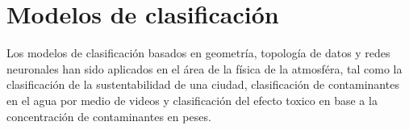 \section{Modelos de clasificación}

Los modelos de clasificación basados en geometría, topología de datos y redes neuronales han sido aplicados en el área de la física de la atmosféra, tal como la clasificación de la sustentabilidad de una ciudad\cite{Haldorai_2020}, clasificación de contaminantes en el agua por medio de videos\cite{KangSeung_2021} y clasificación del efecto toxico en base a la concentración de contaminantes en peses\cite{Verhaar_2000}.





